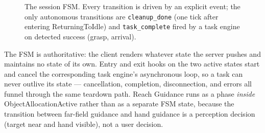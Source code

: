 \begin{figure}[H]
\centering
{}
\caption[Session finite state machine]{The session FSM. Every transition is driven by an explicit event; the only
autonomous transitions are \texttt{cleanup\_done} (one tick after entering
ReturningToIdle) and \texttt{task\_complete} fired by a task engine on detected
success (grasp, arrival).}
\label{fig:fsm}
\end{figure}

The FSM is authoritative: the client renders whatever state the server pushes and
maintains no state of its own. Entry and exit hooks on the two active states start
and cancel the corresponding task engine's asynchronous loop, so a task can never
outlive its state --- cancellation, completion, disconnection, and errors all funnel
through the same teardown path. Reach Guidance runs as a phase \emph{inside}
ObjectAllocationActive rather than as a separate FSM state, because the transition
between far-field guidance and hand guidance is a perception decision (target near
and hand visible), not a user decision.

